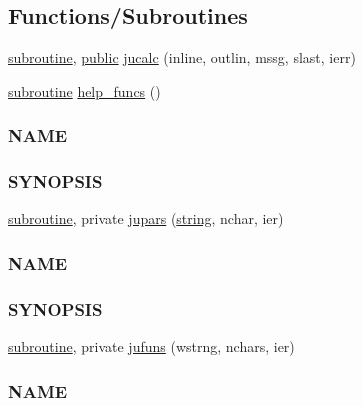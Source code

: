\subsection*{Functions/\+Subroutines}
\begin{DoxyCompactItemize}
\item 
\hyperlink{M__stopwatch_83_8txt_acfbcff50169d691ff02d4a123ed70482}{subroutine}, \hyperlink{M__stopwatch_83_8txt_a2f74811300c361e53b430611a7d1769f}{public} \hyperlink{namespacem__calculator_a7a98aaf2fb03204125187dfec671ce1f}{jucalc} (inline, outlin, mssg, slast, ierr)
\item 
\hyperlink{M__stopwatch_83_8txt_acfbcff50169d691ff02d4a123ed70482}{subroutine} \hyperlink{namespacem__calculator_a190e152c2fc309d59e75ee4645e6d261}{help\+\_\+funcs} ()
\begin{DoxyCompactList}\small\item\em \subsubsection*{N\+A\+ME}

\subsubsection*{S\+Y\+N\+O\+P\+S\+IS}\end{DoxyCompactList}\item 
\hyperlink{M__stopwatch_83_8txt_acfbcff50169d691ff02d4a123ed70482}{subroutine}, private \hyperlink{namespacem__calculator_afabadeb80314b52e904de9865f67ea9d}{jupars} (\hyperlink{what__overview_81_8txt_a74cb7e955273b9f9157b4f0c18a38849}{string}, nchar, ier)
\begin{DoxyCompactList}\small\item\em \subsubsection*{N\+A\+ME}

\subsubsection*{S\+Y\+N\+O\+P\+S\+IS}\end{DoxyCompactList}\item 
\hyperlink{M__stopwatch_83_8txt_acfbcff50169d691ff02d4a123ed70482}{subroutine}, private \hyperlink{namespacem__calculator_ab9afbbbd87dd1434f72853350afec2a6}{jufuns} (wstrng, nchars, ier)
\begin{DoxyCompactList}\small\item\em \subsubsection*{N\+A\+ME}


\end{DoxyCompactList}
\end{DoxyCompactItemize}
